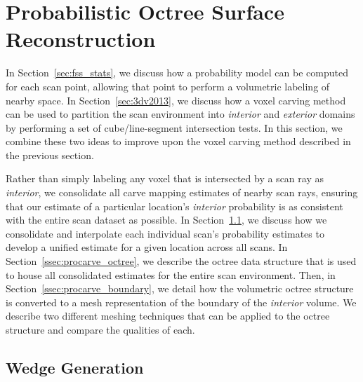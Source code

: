 \documentclass[12pt,onecolumn,oneside]{book}
\begin{document}
\section{Probabilistic Octree Surface Reconstruction}
\label{sec:procarve}

In Section~\ref{sec:fss_stats}, we discuss how a probability model can be computed for each scan point, allowing that point to perform a volumetric labeling of nearby space.  In Section~\ref{sec:3dv2013}, we discuss how a voxel carving method can be used to partition the scan environment into {\it interior} and {\it exterior} domains by performing a set of cube/line-segment intersection tests.  In this section, we combine these two ideas to improve upon the voxel carving method described in the previous section.

Rather than simply labeling any voxel that is intersected by a scan ray as {\it interior}, we consolidate all carve mapping estimates of nearby scan rays, ensuring that our estimate of a particular location's {\it interior} probability is as consistent with the entire scan dataset as possible.  In Section~\ref{ssec:procarve_wedge_and_chunk}, we discuss how we consolidate and interpolate each individual scan's probability estimates to develop a unified estimate for a given location across all scans.  In Section~\ref{ssec:procarve_octree}, we describe the octree data structure that is used to house all consolidated estimates for the entire scan environment.  Then, in Section~\ref{ssec:procarve_boundary}, we detail how the volumetric octree structure is converted to a mesh representation of the boundary of the {\it interior} volume.  We describe two different meshing techniques that can be applied to the octree structure and compare the qualities of each.

\subsection{Wedge Generation}
\label{ssec:procarve_wedge_and_chunk}
\end{document}
